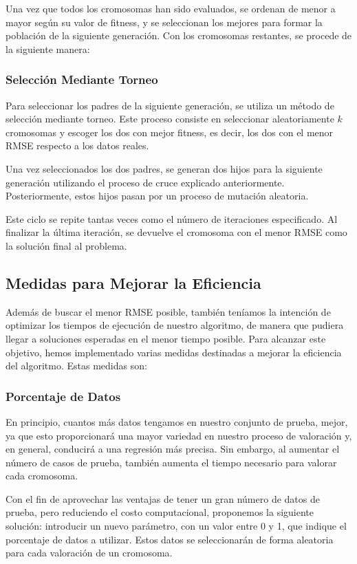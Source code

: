 \documentclass[conference,a4paper]{IEEEtran}
\begin{document}
Una vez que todos los cromosomas han sido evaluados, se ordenan de menor a mayor según su valor de fitness, y se seleccionan los mejores para formar la población de la siguiente generación. Con los cromosomas restantes, se procede de la siguiente manera:

\subsubsection{Selección Mediante Torneo}
Para seleccionar los padres de la siguiente generación, se utiliza un método de selección mediante torneo. Este proceso consiste en seleccionar aleatoriamente \(k\) cromosomas y escoger los dos con mejor fitness, es decir, los dos con el menor RMSE respecto a los datos reales.

Una vez seleccionados los dos padres, se generan dos hijos para la siguiente generación utilizando el proceso de cruce explicado anteriormente. Posteriormente, estos hijos pasan por un proceso de mutación aleatoria. 

Este ciclo se repite tantas veces como el número de iteraciones especificado. Al finalizar la última iteración, se devuelve el cromosoma con el menor RMSE como la solución final al problema.


\subsection{Medidas para Mejorar la Eficiencia}
Además de buscar el menor RMSE posible, también teníamos la intención de optimizar los tiempos de ejecución de nuestro algoritmo, de manera que pudiera llegar a soluciones esperadas en el menor tiempo posible. Para alcanzar este objetivo, hemos implementado varias medidas destinadas a mejorar la eficiencia del algoritmo. Estas medidas son:

\subsubsection{Porcentaje de Datos}
En principio, cuantos más datos tengamos en nuestro conjunto de prueba, mejor, ya que esto proporcionará una mayor variedad en nuestro proceso de valoración y, en general, conducirá a una regresión más precisa. Sin embargo, al aumentar el número de casos de prueba, también aumenta el tiempo necesario para valorar cada cromosoma. 

Con el fin de aprovechar las ventajas de tener un gran número de datos de prueba, pero reduciendo el costo computacional, proponemos la siguiente solución: introducir un nuevo parámetro, con un valor entre 0 y 1, que indique el porcentaje de datos a utilizar. Estos datos se seleccionarán de forma aleatoria para cada valoración de un cromosoma. 
\end{document}
